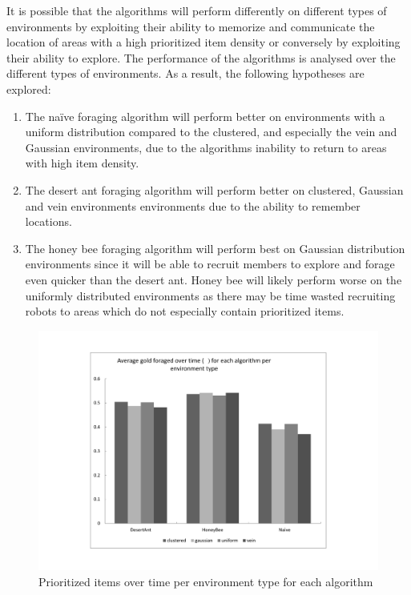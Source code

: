It is possible that the algorithms will perform differently on different types of environments by exploiting their ability to memorize and communicate the location of areas with a high prioritized item density or conversely by exploiting their ability to explore. The performance of the algorithms is analysed over the different types of environments. As a result, the following hypotheses are explored:  

\begin{enumerate}
	\item The na\"ive foraging algorithm will perform better on environments with a uniform distribution compared to the clustered, and especially the vein and Gaussian environments, due to the algorithms inability to return to areas with high item density. 
	\item The desert ant foraging algorithm will perform better on clustered, Gaussian and vein environments environments due to the ability to remember locations.
	 \item The honey bee foraging algorithm will perform best on Gaussian distribution environments since it will be able to recruit members to explore and forage even quicker than the desert ant. Honey bee will likely perform worse on the uniformly distributed environments as there may be time wasted recruiting robots to areas which do not especially contain prioritized items.
\end{enumerate}

\begin{figure}[!htb]
\centering
\includegraphics[width=\textwidth]{chapters/chapter6/graphs/gold_environment.pdf}
\caption{Prioritized items over time per environment type for each algorithm}
\label{environmentgoldplot}
\end{figure}

